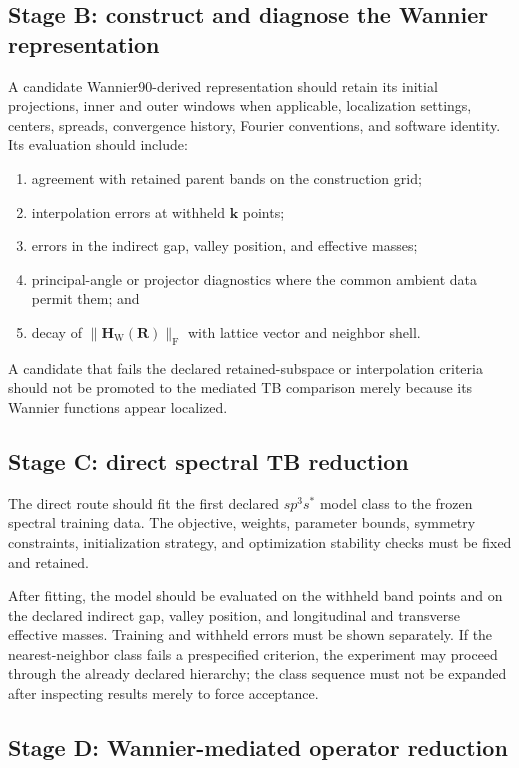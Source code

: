 \subsection{Stage B: construct and diagnose the Wannier representation}

A candidate Wannier90-derived representation should retain its initial
projections, inner and outer windows when applicable, localization settings,
centers, spreads, convergence history, Fourier conventions, and software
identity. Its evaluation should include:
\begin{enumerate}
    \item agreement with retained parent bands on the construction grid;
    \item interpolation errors at withheld $\mathbf k$ points;
    \item errors in the indirect gap, valley position, and effective masses;
    \item principal-angle or projector diagnostics where the common ambient
          data permit them; and
    \item decay of $\lVert\mathbf H_{\mathrm W}(\mathbf R)\rVert_{\mathrm F}$
          with lattice vector and neighbor shell.
\end{enumerate}
A candidate that fails the declared retained-subspace or interpolation criteria
should not be promoted to the mediated TB comparison merely because its
Wannier functions appear localized.

\subsection{Stage C: direct spectral TB reduction}

The direct route should fit the first declared $sp^3s^{\ast}$ model class to
the frozen spectral training data. The objective, weights, parameter bounds,
symmetry constraints, initialization strategy, and optimization stability
checks must be fixed and retained.

After fitting, the model should be evaluated on the withheld band points and
on the declared indirect gap, valley position, and longitudinal and transverse
effective masses. Training and withheld errors must be shown separately. If the
nearest-neighbor class fails a prespecified criterion, the experiment may
proceed through the already declared hierarchy; the class sequence must not be
expanded after inspecting results merely to force acceptance.

\subsection{Stage D: Wannier-mediated operator reduction}

